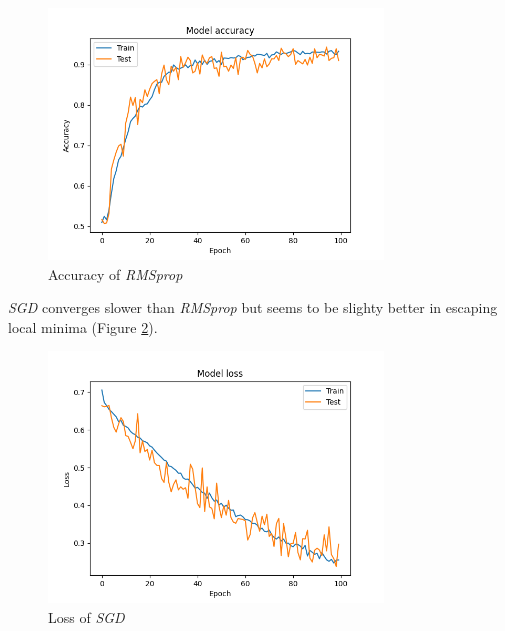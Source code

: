 \documentclass[compsoc]{IEEEtran}
\begin{document}
\begin{figure}[ht!]
\centering                                                                        
\includegraphics[width=3.5in]{../images/accuracy-4000-6-binary_crossentropy-rmsprop-100-4.png}
\captionsetup{justification=centering}                                                                                                                                   
\caption{Accuracy of \emph{RMSprop}}
\label{fig:r2}
\end{figure}


\emph{SGD} converges slower than \emph{RMSprop} but seems to be slighty better in escaping local minima (Figure \ref{fig:s1}).


\begin{figure}[ht!]
\centering                                                                        
\includegraphics[width=3.5in]{../images/loss-4000-6-binary_crossentropy-sgd-100-4.png}
\captionsetup{justification=centering}                                                                                                                                   
\caption{Loss of \emph{SGD}}
\label{fig:s1}
\end{figure}
\end{document}
